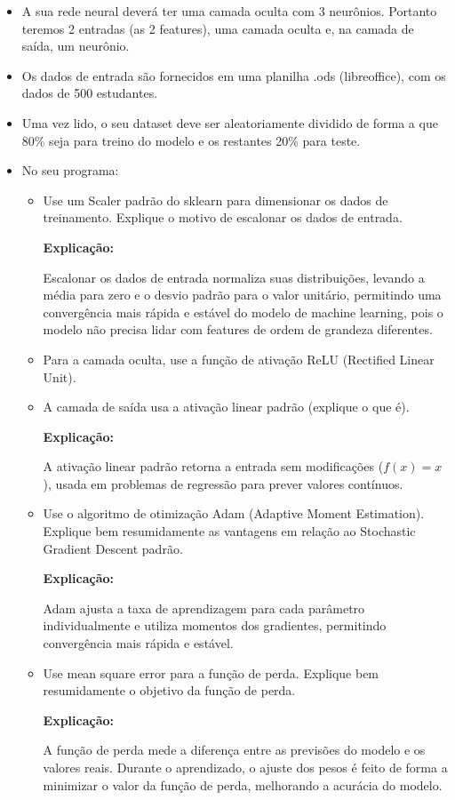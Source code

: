 \documentclass[12 pt]{article}
\begin{document}
\begin{itemize}
    \item A sua rede neural deverá ter uma camada oculta com 3 neurônios. Portanto teremos 2 entradas (as 2 features), uma camada oculta e, na camada de saída, um neurônio.
    \item Os dados de entrada são fornecidos em uma planilha .ods (libreoffice), com os dados de 500 estudantes.
    \item Uma vez lido, o seu dataset deve ser aleatoriamente dividido de forma a que 80\% seja para treino do modelo e os restantes 20\% para teste.
    \item No seu programa:
    \begin{itemize}
        \item Use um Scaler padrão do sklearn para dimensionar os dados de treinamento. Explique o motivo de escalonar os dados de entrada.
        
        \textbf{Explicação:} \par

        Escalonar os dados de entrada normaliza suas distribuições, levando a média para zero e o desvio padrão para o valor unitário, permitindo uma convergência mais rápida e estável do modelo de machine learning, pois o modelo não precisa lidar com features de ordem de grandeza diferentes.

        \item Para a camada oculta, use a função de ativação ReLU (Rectified Linear Unit).
        \item A camada de saída usa a ativação linear padrão (explique o que é).
        
        \textbf{Explicação:} \par

        A ativação linear padrão retorna a entrada sem modificações ($f(x)=x$), usada em problemas de regressão para prever valores contínuos.

        \item Use o algoritmo de otimização Adam (Adaptive Moment Estimation). Explique bem resumidamente as vantagens em relação ao Stochastic Gradient Descent padrão.
        
        \textbf{Explicação:} \par

        Adam ajusta a taxa de aprendizagem para cada parâmetro individualmente e utiliza momentos dos gradientes, permitindo convergência mais rápida e estável.

        \item Use mean square error para a função de perda. Explique bem resumidamente o objetivo da função de perda.
          
        \textbf{Explicação:} \par

        A função de perda mede a diferença entre as previsões do modelo e os valores reais. Durante o aprendizado, o ajuste dos pesos é feito de forma a minimizar o valor da função de perda, melhorando a acurácia do modelo.

    \end{itemize}
\end{itemize}
\end{document}

